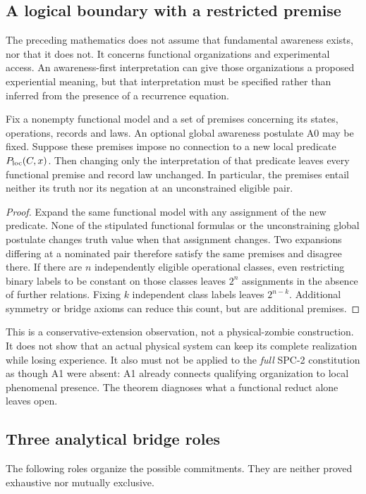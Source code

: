 \subsection{A logical boundary with a restricted premise}
The preceding mathematics does not assume that fundamental awareness exists, nor that it does not. It concerns functional organizations and experimental access. An awareness-first interpretation can give those organizations a proposed experiential meaning, but that interpretation must be specified rather than inferred from the presence of a recurrence equation.

\begin{proposition}\label{p2-30}
Fix a nonempty functional model and a set of premises concerning its states, operations, records and laws. An optional global awareness postulate A0 may be fixed. Suppose these premises impose no connection to a new local predicate \(P_{\mathrm{loc}}(C,x)\). Then changing only the interpretation of that predicate leaves every functional premise and record law unchanged. In particular, the premises entail neither its truth nor its negation at an unconstrained eligible pair.
\end{proposition}
\begin{proof}
Expand the same functional model with any assignment of the new predicate. None of the stipulated functional formulas or the unconstraining global postulate changes truth value when that assignment changes. Two expansions differing at a nominated pair therefore satisfy the same premises and disagree there. If there are \(n\) independently eligible operational classes, even restricting binary labels to be constant on those classes leaves \(2^n\) assignments in the absence of further relations. Fixing \(k\) independent class labels leaves \(2^{n-k}\). Additional symmetry or bridge axioms can reduce this count, but are additional premises.
\end{proof}
This is a conservative-extension observation, not a physical-zombie construction. It does not show that an actual physical system can keep its complete realization while losing experience. It also must not be applied to the \emph{full} SPC-2 constitution as though A1 were absent: A1 already connects qualifying organization to local phenomenal presence. The theorem diagnoses what a functional reduct alone leaves open.

\subsection{Three analytical bridge roles}
The following roles organize the possible commitments. They are neither proved exhaustive nor mutually exclusive.

